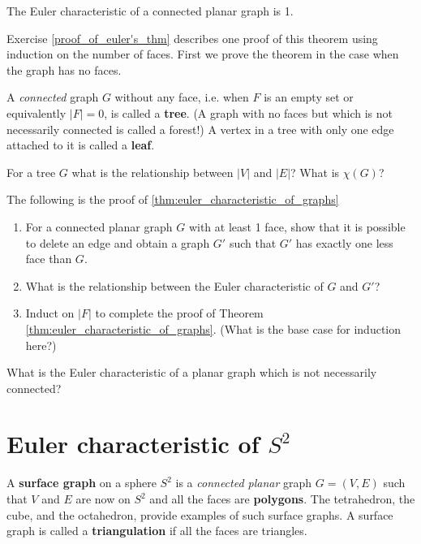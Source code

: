 \begin{thm}\label{thm:euler_characteristic_of_graphs}
	The Euler characteristic of a connected planar graph is 1.
\end{thm}

Exercise \ref{proof_of_euler's_thm} describes one proof of this theorem using induction on the number of faces. First we prove the theorem in the case when the graph has no faces.

A \emph{connected} graph $ G $ without any face, i.e. when $ F $ is an empty set  or equivalently $ |F| = 0 $, is called a \textbf{tree}. (A graph with no faces but which is not necessarily connected is called a forest!) A vertex in a tree with only one edge attached to it is called a \textbf{leaf}.

\begin{exercise}
	For a tree $ G $ what is the relationship between $ |V| $ and $ |E| $? What is $ \chi (G)$?
\end{exercise}

\begin{exercise}\label{proof_of_euler's_thm}
	The following is the proof of \eqref{thm:euler_characteristic_of_graphs}
	\begin{enumerate}
		\item For a connected planar graph $ G $ with at least 1 face, show that it is possible to delete an edge and obtain a graph $ G' $ such that $G' $ has exactly one less face than $ G $.
		\item What is the relationship between the Euler characteristic of $ G $ and $ G' $?
		\item Induct on $ |F| $ to complete the proof of Theorem \ref{thm:euler_characteristic_of_graphs}. (What is the base case for induction here?)
	\end{enumerate}
\end{exercise}

\begin{exercise}
	What is the Euler characteristic of a planar graph which is not necessarily connected?
\end{exercise}






\section{Euler characteristic of $ S ^ 2 $}

A \textbf{surface graph} on a sphere $ S ^ 2 $ is a \emph{connected planar} graph $ G = (V,E) $ such that $ V $ and $ E $ are now on $ S ^ 2 $ and all the faces are \textbf{polygons}. The tetrahedron, the cube, and the octahedron, provide examples of such surface graphs. A surface graph is called a \textbf{triangulation} if all the faces are triangles.

